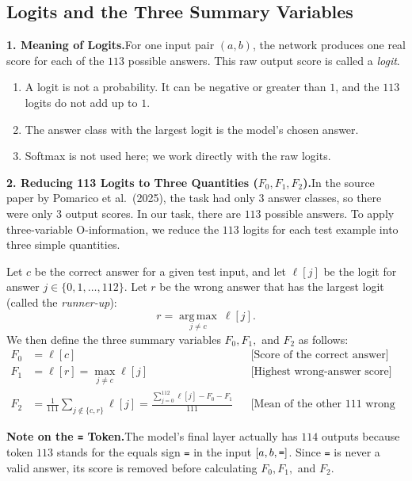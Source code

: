 \documentclass[11pt,a4paper,oneside]{report}
\newcommand{\Fzero}{F_{0}}
\newcommand{\Fone}{F_{1}}
\newcommand{\Ftwo}{F_{2}}
\begin{document}
\subsection{Logits and the Three Summary Variables}

\noindent\textbf{1. Meaning of Logits.}\quad For one input pair $(a, b)$, the network produces one real score for each of the $113$ possible answers. This raw output score is called a \emph{logit}.
\begin{enumerate}[label=\textbf{(\roman*)}]
\item A logit is not a probability. It can be negative or greater than $1$, and the $113$ logits do not add up to $1$.
\item The answer class with the largest logit is the model's chosen answer.
\item Softmax is not used here; we work directly with the raw logits.
\end{enumerate}

\noindent\textbf{2. Reducing 113 Logits to Three Quantities ($\Fzero, \Fone, \Ftwo$).}\quad In the source paper by Pomarico et al.\ (2025), the task had only $3$ answer classes, so there were only $3$ output scores. In our task, there are $113$ possible answers. To apply three-variable O-information, we reduce the $113$ logits for each test example into three simple quantities.

Let $c$ be the correct answer for a given test input, and let $\ell[j]$ be the logit for answer $j \in \{0, 1, \ldots, 112\}$. Let $r$ be the wrong answer that has the largest logit (called the \emph{runner-up}):
\begin{equation}
r = \underset{j \neq c}{\operatorname{arg\,max}}\ \ell[j].
\end{equation}
We then define the three summary variables $\Fzero, \Fone,$ and $\Ftwo$ as follows:
\begin{align}
\Fzero &= \ell[c] && \text{[Score of the correct answer]}\label{eq:f0}\\
\Fone  &= \ell[r] = \max_{j \neq c}\ell[j] && \text{[Highest wrong-answer score]}\label{eq:f1}\\
\Ftwo  &= \frac{1}{111}\sum_{j \notin \{c, r\}} \ell[j] = \frac{\sum_{j=0}^{112}\ell[j] - \Fzero - \Fone}{111} && \text{[Mean of the other 111 wrong scores]}\label{eq:f2}
\end{align}

\noindent\textbf{Note on the \texttt{=} Token.}\quad The model's final layer actually has $114$ outputs because token $113$ stands for the equals sign \texttt{=} in the input $[a, b, \text{\texttt{=}}]$. Since \texttt{=} is never a valid answer, its score is removed before calculating $\Fzero, \Fone,$ and $\Ftwo$.
\end{document}
